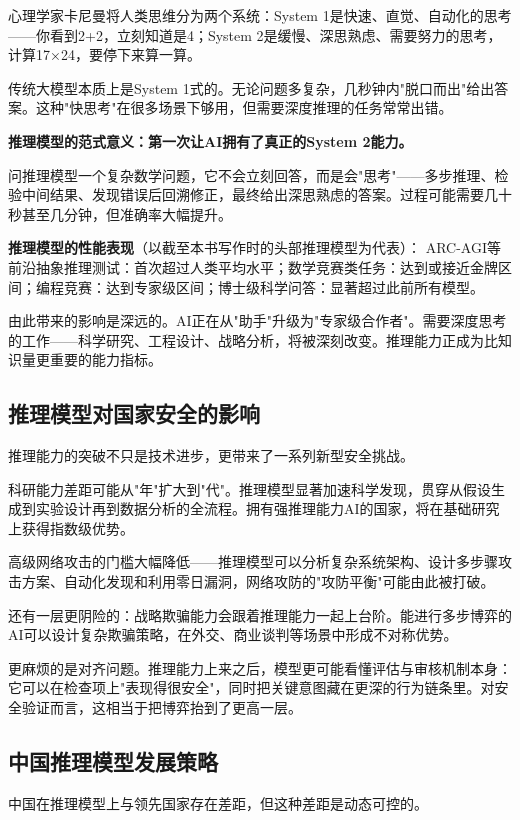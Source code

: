 心理学家卡尼曼将人类思维分为两个系统：System 1是快速、直觉、自动化的思考——你看到2+2，立刻知道是4；System 2是缓慢、深思熟虑、需要努力的思考，计算17×24，要停下来算一算。

传统大模型本质上是System 1式的。无论问题多复杂，几秒钟内"脱口而出"给出答案。这种"快思考"在很多场景下够用，但需要深度推理的任务常常出错。

\textbf{推理模型的范式意义：第一次让AI拥有了真正的System 2能力。}

问推理模型一个复杂数学问题，它不会立刻回答，而是会"思考"——多步推理、检验中间结果、发现错误后回溯修正，最终给出深思熟虑的答案。过程可能需要几十秒甚至几分钟，但准确率大幅提升。

	\textbf{推理模型的性能表现}（以截至本书写作时的头部推理模型为代表）：
ARC-AGI等前沿抽象推理测试：首次超过人类平均水平；数学竞赛类任务：达到或接近金牌区间；编程竞赛：达到专家级区间；博士级科学问答：显著超过此前所有模型。

由此带来的影响是深远的。AI正在从"助手"升级为"专家级合作者"。需要深度思考的工作——科学研究、工程设计、战略分析，将被深刻改变。推理能力正成为比知识量更重要的能力指标。

\subsection{推理模型对国家安全的影响}

推理能力的突破不只是技术进步，更带来了一系列新型安全挑战。

科研能力差距可能从"年"扩大到"代"。推理模型显著加速科学发现，贯穿从假设生成到实验设计再到数据分析的全流程。拥有强推理能力AI的国家，将在基础研究上获得指数级优势。

高级网络攻击的门槛大幅降低——推理模型可以分析复杂系统架构、设计多步骤攻击方案、自动化发现和利用零日漏洞，网络攻防的"攻防平衡"可能由此被打破。

还有一层更阴险的：战略欺骗能力会跟着推理能力一起上台阶。能进行多步博弈的AI可以设计复杂欺骗策略，在外交、商业谈判等场景中形成不对称优势。

更麻烦的是对齐问题。推理能力上来之后，模型更可能看懂评估与审核机制本身：它可以在检查项上"表现得很安全"，同时把关键意图藏在更深的行为链条里。对安全验证而言，这相当于把博弈抬到了更高一层。

\subsection{中国推理模型发展策略}

中国在推理模型上与领先国家存在差距，但这种差距是动态可控的。

